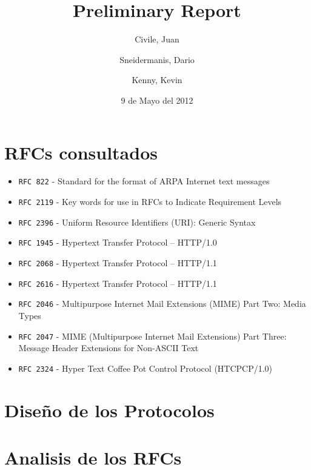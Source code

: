 \documentclass[11pt,a4paper,titlepage]{article}
\title{Preliminary Report}
\author{Civile, Juan \and Sneidermanis, Dario \and Kenny, Kevin}
\date{9 de Mayo del 2012}
\begin{document}
\newcommand{\awesome}[1]{\texttt{\large #1}}
\newcommand{\ua}{\textit{User Agent} }
\newcommand{\os}{\textit{Origin Server} }

\maketitle
\tableofcontents
\clearpage

\section{RFCs consultados}

\begin{itemize}

    \item \awesome{RFC 822}  - Standard for the format of ARPA Internet text messages
    \item \awesome{RFC 2119} - Key words for use in RFCs to Indicate Requirement Levels
    \item \awesome{RFC 2396} - Uniform Resource Identifiers (URI): Generic Syntax
    \item \awesome{RFC 1945} - Hypertext Transfer Protocol -- HTTP/1.0
    \item \awesome{RFC 2068} - Hypertext Transfer Protocol -- HTTP/1.1
    \item \awesome{RFC 2616} - Hypertext Transfer Protocol -- HTTP/1.1
    \item \awesome{RFC 2046} - Multipurpose Internet Mail Extensions (MIME) Part Two: Media Types
    \item \awesome{RFC 2047} - MIME (Multipurpose Internet Mail Extensions) Part Three: Message Header Extensions for Non-ASCII Text
    \item \awesome{RFC 2324} - Hyper Text Coffee Pot Control Protocol (HTCPCP/1.0)

\end{itemize}

\section{Diseño de los Protocolos}

\section{Analisis de los RFCs}
\end{document}
